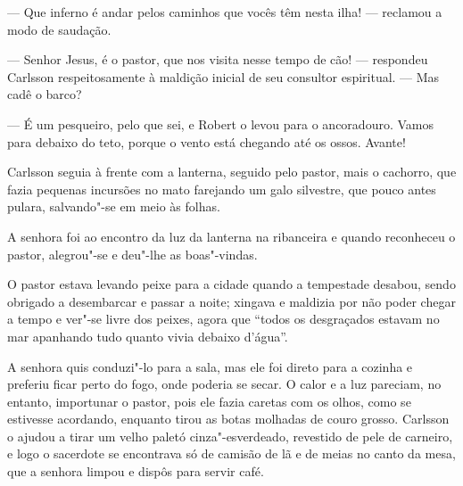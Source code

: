 --- Que inferno é andar pelos caminhos que vocês têm nesta ilha! --- reclamou a
modo de saudação.

--- Senhor Jesus, é o pastor, que nos visita nesse tempo de cão! --- respondeu
Carlsson respeitosamente à maldição inicial de seu consultor espiritual. --- Mas
cadê o barco?

--- É um pesqueiro, pelo que sei, e Robert o levou para o ancoradouro. Vamos para
debaixo do teto, porque o vento está chegando até os ossos. Avante!

Carlsson seguia à frente com a lanterna, seguido pelo pastor, mais o cachorro,
que fazia pequenas incursões no mato farejando um galo silvestre, que pouco
antes pulara, salvando"-se em meio às folhas.

A senhora foi ao encontro da luz da lanterna na ribanceira e quando reconheceu o
pastor, alegrou"-se e deu"-lhe as boas"-vindas.

O pastor estava levando peixe para a cidade quando a tempestade desabou, sendo
obrigado a desembarcar e passar a noite; xingava e maldizia por não poder chegar
a tempo e ver"-se livre dos peixes, agora que ``todos os desgraçados estavam no mar
apanhando tudo quanto vivia debaixo d’água''.

A senhora quis conduzi"-lo para a sala, mas ele foi direto para a
cozinha e preferiu ficar perto do fogo, onde poderia se secar. O calor e a luz
pareciam, no entanto, importunar o pastor, pois ele fazia caretas com os olhos,
como se estivesse acordando, enquanto tirou as botas molhadas de couro grosso.
Carlsson o ajudou a tirar um velho paletó cinza"-esverdeado,
revestido de pele de carneiro, e logo o sacerdote se encontrava só de camisão de
lã e de meias no canto da mesa, que a senhora limpou e dispôs para servir café.

